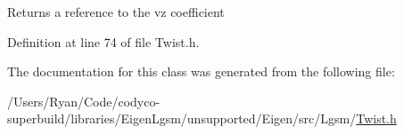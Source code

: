 \begin{DoxyReturn}{Returns}
a reference to the {\ttfamily vz} coefficient 
\end{DoxyReturn}


Definition at line 74 of file Twist.\+h.



The documentation for this class was generated from the following file\+:\begin{DoxyCompactItemize}
\item 
/\+Users/\+Ryan/\+Code/codyco-\/superbuild/libraries/\+Eigen\+Lgsm/unsupported/\+Eigen/src/\+Lgsm/\hyperlink{_twist_8h}{Twist.\+h}\end{DoxyCompactItemize}
